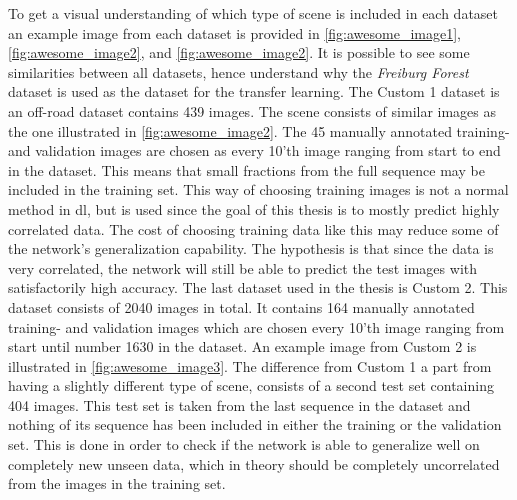 \documentclass[USenglish]{ifimaster}  %
\begin{document}
To get a visual understanding of which type of scene is included in each dataset an example image from each dataset is provided in \cref{fig:awesome_image1}, \cref{fig:awesome_image2}, and \cref{fig:awesome_image2}. It is possible to see some similarities between all datasets, hence understand why the \textit{Freiburg Forest} dataset is used as the dataset for the transfer learning. 
\newline
\newline
The Custom 1 dataset is an off-road dataset contains 439 images. The scene consists of similar images as the one illustrated in \cref{fig:awesome_image2}. The 45 manually annotated training- and validation images are chosen as every 10'th image ranging from start to end in the dataset. This means that small fractions from the full sequence may be included in the training set. This way of choosing training images is not a normal method in \ac{dl}, but is used since the goal of this thesis is to mostly predict highly correlated data. The cost of choosing training data like this may reduce some of the network's generalization capability. The hypothesis is that since the data is very correlated, the network will still be able to predict the test images with satisfactorily high accuracy. 
\newline
\newline
The last dataset used in the thesis is Custom 2. This dataset consists of 2040 images in total. It contains 164 manually annotated training- and validation images which are chosen every 10'th image ranging from start until number 1630 in the dataset. An example image from Custom 2 is illustrated in \cref{fig:awesome_image3}. The difference from Custom 1 a part from having a slightly different type of scene, consists of a second test set containing 404 images. This test set is taken from the last sequence in the dataset and nothing of its sequence has been included in either the training or the validation set. This is done in order to check if the network is able to generalize well on completely new unseen data, which in theory should be completely uncorrelated from the images in the training set.
\end{document}
